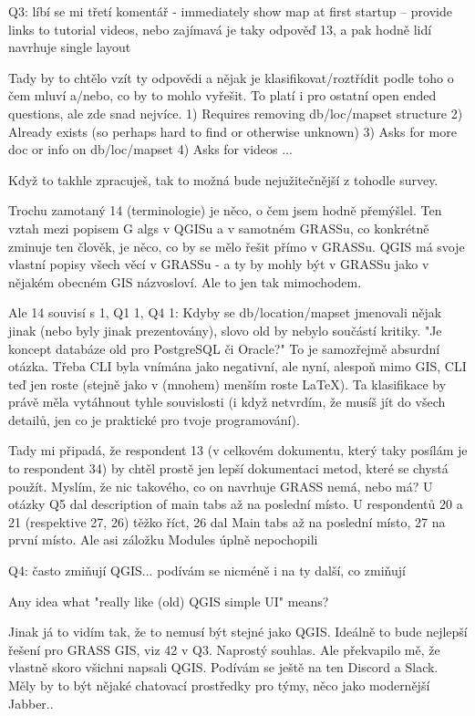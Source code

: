 \documentclass[a4paper,10pt,twoside]{article}
\begin{document}
    Q3: líbí se mi třetí komentář - immediately show map at first startup -- provide links to tutorial videos, nebo zajímavá je taky odpověď 13, a pak hodně lidí navrhuje single layout
    
    Tady by to chtělo vzít ty odpovědi a nějak je klasifikovat/roztřídit podle toho o čem mluví a/nebo, co by to mohlo vyřešit. To platí i pro ostatní open ended questions, ale zde snad nejvíce. 1) Requires removing db/loc/mapset structure 2) Already exists (so perhaps hard to find or otherwise unknown) 3) Asks for more doc or info on db/loc/mapset 4) Asks for videos ...

Když to takhle zpracuješ, tak to možná bude nejužitečnější z tohodle survey.

Trochu zamotaný 14 (terminologie) je něco, o čem jsem hodně přemýšlel. Ten vztah mezi popisem G algs v QGISu a v samotném GRASSu, co konkrétně zminuje ten člověk, je něco, co by se mělo řešit přímo v GRASSu. QGIS má svoje vlastní popisy všech věcí v GRASSu - a ty by mohly být v GRASSu jako v nějakém obecném GIS názvosloví. Ale to jen tak mimochodem.

Ale 14 souvisí s 1, Q1 1, Q4 1: Kdyby se db/location/mapset jmenovali nějak jinak (nebo byly jinak prezentovány), slovo old by nebylo součástí kritiky. "Je koncept databáze old pro PostgreSQL či Oracle?" To je samozřejmě absurdní otázka. Třeba CLI byla vnímána jako negativní, ale nyní, alespoň mimo GIS, CLI teď jen roste (stejně jako v (mnohem) menším roste LaTeX). Ta klasifikace by právě měla vytáhnout tyhle souvislosti (i když netvrdím, že musíš jít do všech detailů, jen co je praktické pro tvoje programování).

Tady mi připadá, že respondent 13 (v celkovém dokumentu, který taky posílám je to respondent 34) by chtěl prostě jen lepší dokumentaci metod, které se chystá použít. Myslím, že nic takového, co on navrhuje GRASS nemá, nebo má? U otázky Q5 dal description of main tabs až na poslední místo.
U respondentů 20 a 21 (respektive 27, 26) těžko říct, 26 dal Main tabs až na poslední místo, 27 na první místo. Ale asi záložku Modules úplně nepochopili
 
 
    Q4: často zmiňují QGIS... podívám se nicméně i na ty další, co zmiňují
    
    Any idea what "really like (old) QGIS simple UI" means?

Jinak já to vidím tak, že to nemusí být stejné jako QGIS. Ideálně to bude nejlepší řešení pro GRASS GIS, viz 42 v Q3.
Naprostý souhlas. Ale překvapilo mě, že vlastně skoro všichni napsali QGIS. Podívám se ještě na ten Discord a Slack. Měly by to být nějaké chatovací prostředky pro týmy, něco jako modernější Jabber..
\end{document}
